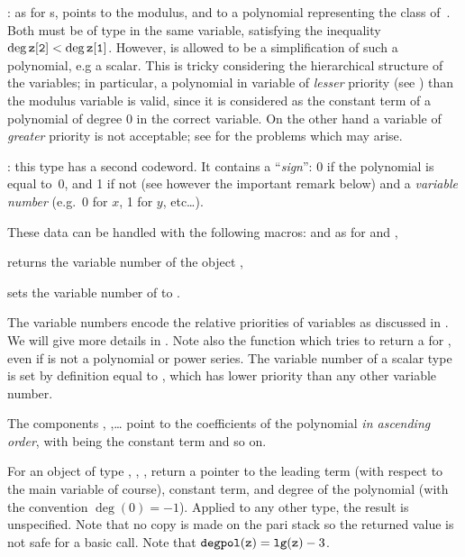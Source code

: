 :
as for s,  points to the modulus, and 
to a polynomial representing the class of~. Both must be of type
 in the same variable, satisfying the inequality $\deg {\tt z[2]}
< \deg {\tt z[1]}$. However,  is allowed to be a simplification
of such a polynomial, e.g a scalar. This is tricky considering the
hierarchical structure of the variables; in particular, a polynomial in
variable of \emph{lesser} priority (see ) than the
modulus variable is valid, since it is considered as the constant term of
a polynomial of degree 0 in the correct variable. On the other hand a
variable of \emph{greater} priority is not acceptable; see
 for the problems which may arise.

: this
type has a second codeword. It contains a ``\emph{sign}'': 0 if the
polynomial is equal to~0, and 1 if not (see however the important remark
below) and a \emph{variable number} (e.g.~0 for $x$, 1 for $y$, etc\dots).

\noindent These data can be handled with the following macros: 
and  as for  and ,

 returns the variable number of the object ,

 sets the variable number of  to
.

The variable numbers encode the relative priorities of variables as discussed
in . We will give more details in . Note
also the function  which tries to return a
 for , even if  is not a polynomial or
power series. The variable number of a scalar type is set by definition equal
to , which has lower priority than any other variable number.

The components , ,\dots {} point to the
coefficients of the polynomial \emph{in ascending order}, with 
being the constant term and so on.

For an object of type , , ,
 return a pointer to the leading term (with respect to the main
variable of course), constant term, and degree of the polynomial (with the
convention $\deg(0) = -1$). Applied to any other type, the result is
unspecified. Note that no copy is made on the pari stack so the returned
value is not safe for a basic  call. Note that ${\tt degpol(z)}
= {\tt lg(z)} - 3$.

